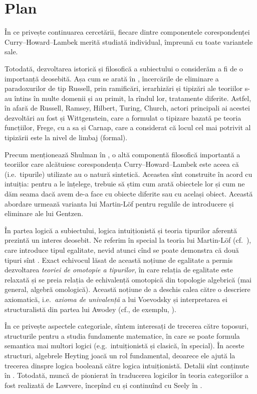 \documentclass[a4paper]{article}
\begin{document}
\section{Plan}

\indent\indent În ce privește continuarea cercetării, fiecare dintre
componentele corespondenței Curry--Howard--Lambek merită studiată
individual, împreună cu toate variantele sale. 

Totodată, dezvoltarea istorică și filosofică a subiectului o considerăm 
a fi de o importanță deosebită. Așa cum se arată în \cite{collins},
încercările de eliminare a paradoxurilor de tip Russell, prin 
ramificări, ierarhizări și tipizări ale teoriilor s-au întins în multe 
domenii și au primit, la rîndul lor, tratamente diferite. Astfel,
în afară de Russell, Ramsey, Hilbert, Turing, Church, actori principali
ai acestei dezvoltări au fost și Wittgenstein, care a formulat o tipizare
bazată pe teoria funcțiilor, Frege, cu a sa  și
Carnap, care a considerat că locul cel mai potrivit al tipizării este
la nivel de limbaj (formal).

Precum menționează Shulman în \cite{sh}, o altă componentă filosofică
importantă a teoriilor care alcătuiesc corespondența Curry--Howard--Lambek
este aceea că  (i.e.\ tipurile) utilizate au o natură sintetică.
Aceastea sînt construite în acord cu intuiția: pentru a le înțelege, trebuie
să știm cum arată obiectele lor și cum ne dăm seama dacă avem de-a face
cu obiecte diferite sau cu același obiect. Această abordare urmează varianta
lui Martin-L\"{o}f pentru regulile de introducere și eliminare ale lui Gentzen.

În partea logică a subiectului, logica intuiționistă și teoria tipurilor
aferentă prezintă un interes deosebit. Ne referim în special la teoria
lui Martin-L\"{o}f (cf.\ \cite{pml}), care introduce tipul egalitate,
nevid atunci cînd se poate demonstra că două tipuri sînt . Exact
echivocul lăsat de această noțiune de egalitate a permis dezvoltarea
\emph{teoriei de omotopie a tipurilor}, în care relația de egalitate este
relaxată și se preia relația de echivalență omotopică din topologie algebrică
(mai general, algebră omologică). Această noțiune de  a deschis
calea către o descriere axiomatică, i.e.\ \emph{axioma de univalență} a lui
Voevodsky și interpretarea ei structuralistă din partea lui Awodey (cf.,
de exemplu, \cite{awos}).

În ce privește aspectele categoriale, sîntem interesați de trecerea către
toposuri, structurile  pentru a studia fundamente matematice,
în care se poate formula semantica mai multori logici (e.g.\ intuiționistă
și clasică, în special). În aceste structuri, algebrele Heyting joacă un rol
fundamental, deoarece ele ajută la trecerea dinspre logica booleană către
logica intuiționistă. Detalii sînt conținute în \cite{gold}. Totodată, muncă
de pionierat în traducerea logicilor în teoria categoriilor a fost realizată
de Lawvere, începînd cu \cite{law} și continuînd cu Seely în \cite{see}.
\end{document}
